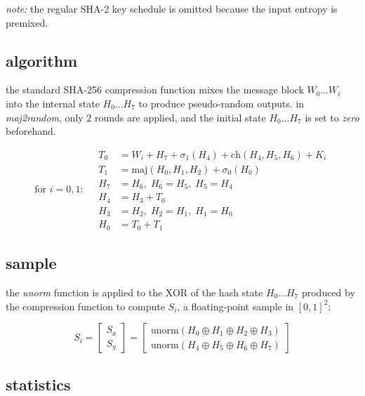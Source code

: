 \documentclass{scrartcl}
\begin{document}
\vspace{1em}

\noindent
\emph{note:} the regular SHA-2 key schedule is omitted because the input
entropy is premixed.

\newpage
\subsection*{algorithm}

\noindent
the standard SHA-256 compression function mixes the message block
$W_0\dots W_i$ into the internal state $H_0\dots H_7$ to produce
pseudo-random outputs. in \textit{maj2random}, only 2 rounds are applied,
and the initial state $H_0\dots H_7$ is set to \textit{zero} beforehand.

\[
\text{for } i = 0,1:
\quad
\begin{aligned}
T_0  &= W_i + H_7 + \sigma_1(H_4) + \mathrm{ch}(H_4, H_5, H_6) + K_i \\
T_1  &= \mathrm{maj}(H_0, H_1, H_2) + \sigma_0(H_0) \\
H_7 &= H_6, \; H_6 = H_5, \; H_5 = H_4 \\
H_4 &= H_3 + T_0 \\
H_3 &= H_2, \; H_2 = H_1, \; H_1 = H_0 \\
H_0 &= T_0 + T_1
\end{aligned}
\]

\vspace{1em}

\subsection*{sample}

\noindent
the \emph{unorm} function is applied to the XOR of the hash state
$H_0\dots H_7$ produced by the compression function to compute $S_i$, a
floating-point sample in $[0,1]^2$:

\[
S_i =
\begin{bmatrix}
S_x \\[1mm] S_y
\end{bmatrix}
=
\begin{bmatrix}
\mathrm{unorm}(H_0 \oplus H_1 \oplus H_2 \oplus H_3) \\[1mm]
\mathrm{unorm}(H_4 \oplus H_5 \oplus H_6 \oplus H_7)
\end{bmatrix}
\]

\vspace{1em}

\subsection*{statistics}
\end{document}
